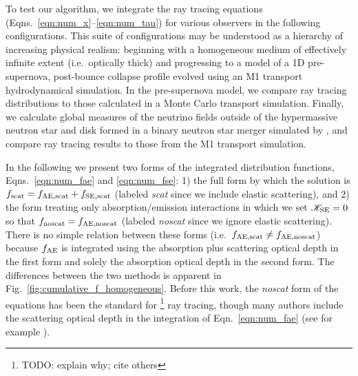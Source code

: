 \documentclass[aps,floatfix,prd,superscriptaddress,twocolumn]{revtex4-1}
\begin{document}
To test our algorithm, we integrate the ray tracing equations
(Eqns.~\ref{eqn:num_x}--\ref{eqn:num_tau}) for various observers
in the following configurations. This suite of configurations
may be understood as a hierarchy of increasing physical realism:
beginning with a homogeneous medium of effectively
infinite extent (i.e.\ optically thick) and progressing to a model of a
1D pre-supernova, post-bounce collapse profile
evolved using an M1 transport hydrodynamical simulation.
In the pre-supernova model, we compare ray tracing distributions
to those calculated in a Monte Carlo transport simulation.
Finally, we calculate global measures of the neutrino fields outside of the
hypermassive neutron star and disk formed in a binary neutron star
merger simulated by \cite{fouc2016-m1_nsns, fouc2016-m1_evolve_n},
and compare ray tracing results to those from the M1 transport simulation.

In the following we present two forms of the integrated distribution functions,
Eqns.~\ref{eqn:num_fae} and \ref{eqn:num_fse}:
1) the full form  by which the solution is $f_{\rm scat}=f_{\rm AE,scat}+f_{\rm SE,scat}$
(labeled \emph{scat} since we include elastic scattering), and
2) the form treating only absorption/emission interactions
in which we set $\mathscr{K}_{\rm SE}=0$ so that $f_{\rm noscat}=f_{\rm AE,noscat}$
(labeled \emph{noscat} since we ignore elastic scattering).
There is no simple relation between these forms
(i.e.\ $f_{\rm AE,scat} \neq f_{\rm AE,noscat}$)
because $f_{\rm AE}$ is integrated using the absorption plus scattering optical depth
in the first form and solely the absorption optical depth in the second form.
The differences between the two methods is apparent
in Fig.~\ref{fig:cumulative_f_homogeneous}.
Before this work, the \emph{noscat} form of the equations has been the standard for
\footnote{TODO: explain why; cite others}
ray tracing, though many authors include the scattering optical depth in
the integration of Eqn.~\ref{eqn:num_fae}
(see for example \cite{hari2010-gr_nunubar_collapsar}).
\end{document}
